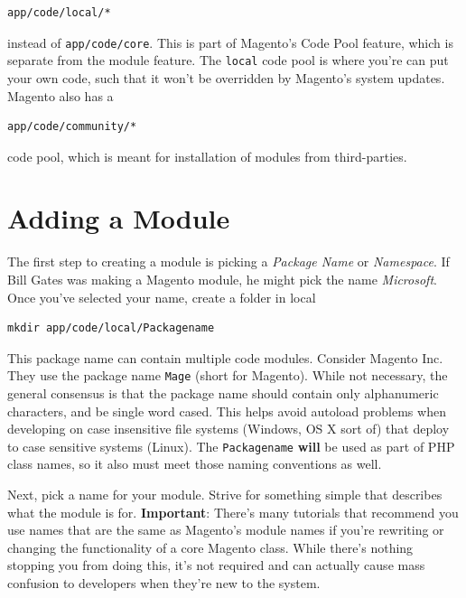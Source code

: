 \documentclass[oneside]{book}
\begin{document}
\begin{lstlisting}
app/code/local/*

\end{lstlisting}


instead of \footnotesize\texttt{app/code/core}\normalsize. This is part of Magento's Code Pool feature, which is separate from the module feature.  The \footnotesize\texttt{local} \normalsize  code pool is where you're can put your own code, such that it won't be overridden by Magento's system updates.  Magento also has a 

\begin{lstlisting}
app/code/community/*

\end{lstlisting}


code pool, which is meant for installation of modules from third-parties.

\section{Adding a Module}

The first step to creating a module is picking a \emph{Package Name} or \emph{Namespace}.  If Bill Gates was making a Magento module, he might pick the name \emph{Microsoft}.  Once you've selected your name, create a folder in local

\begin{lstlisting}
mkdir app/code/local/Packagename

\end{lstlisting}


This package name can contain multiple code modules.  Consider Magento Inc.  They use the package name \footnotesize\texttt{Mage} \normalsize  (short for Magento).  While not necessary, the general consensus is that the package name should contain only alphanumeric characters, and be single word cased.  This helps avoid autoload problems when developing on case insensitive file systems (Windows, OS X sort of) that deploy to case sensitive systems (Linux). The \footnotesize\texttt{Packagename} \normalsize  \textbf{will} be used as part of PHP class names, so it also must meet those naming conventions as well.

Next, pick a name for your module. Strive for something simple that describes what the module is for.  \textbf{Important}: There's many tutorials that recommend you use names that are the same as Magento's module names if you're rewriting or changing the functionality of a core Magento class.  While there's nothing stopping you from doing this, it's not required and can actually cause mass confusion to developers when they're new to the system.  
\end{document}

